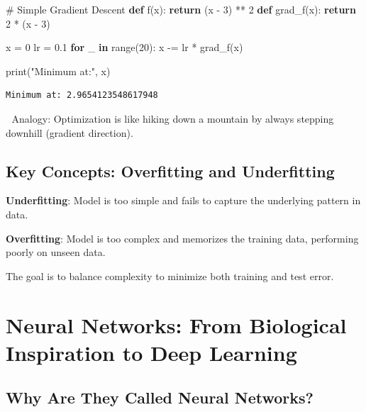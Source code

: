 \documentclass[
  letterpaper,
  DIV=11,
  numbers=noendperiod]{scrreprt}
\newenvironment{Shaded}{\begin{snugshade}}{\end{snugshade}}
\newcommand{\BuiltInTok}[1]{\textcolor[rgb]{0.00,0.23,0.31}{#1}}
\newcommand{\CommentTok}[1]{\textcolor[rgb]{0.37,0.37,0.37}{#1}}
\newcommand{\ControlFlowTok}[1]{\textcolor[rgb]{0.00,0.23,0.31}{\textbf{#1}}}
\newcommand{\DecValTok}[1]{\textcolor[rgb]{0.68,0.00,0.00}{#1}}
\newcommand{\FloatTok}[1]{\textcolor[rgb]{0.68,0.00,0.00}{#1}}
\newcommand{\KeywordTok}[1]{\textcolor[rgb]{0.00,0.23,0.31}{\textbf{#1}}}
\newcommand{\NormalTok}[1]{\textcolor[rgb]{0.00,0.23,0.31}{#1}}
\newcommand{\OperatorTok}[1]{\textcolor[rgb]{0.37,0.37,0.37}{#1}}
\newcommand{\StringTok}[1]{\textcolor[rgb]{0.13,0.47,0.30}{#1}}
\begin{document}
\begin{Shaded}
\begin{Highlighting}[]
\CommentTok{\# Simple Gradient Descent}
\KeywordTok{def}\NormalTok{ f(x): }\ControlFlowTok{return}\NormalTok{ (x }\OperatorTok{{-}} \DecValTok{3}\NormalTok{) }\OperatorTok{**} \DecValTok{2}
\KeywordTok{def}\NormalTok{ grad\_f(x): }\ControlFlowTok{return} \DecValTok{2} \OperatorTok{*}\NormalTok{ (x }\OperatorTok{{-}} \DecValTok{3}\NormalTok{)}

\NormalTok{x }\OperatorTok{=} \DecValTok{0}
\NormalTok{lr }\OperatorTok{=} \FloatTok{0.1}
\ControlFlowTok{for}\NormalTok{ \_ }\KeywordTok{in} \BuiltInTok{range}\NormalTok{(}\DecValTok{20}\NormalTok{):}
\NormalTok{    x }\OperatorTok{{-}=}\NormalTok{ lr }\OperatorTok{*}\NormalTok{ grad\_f(x)}

\BuiltInTok{print}\NormalTok{(}\StringTok{"Minimum at:"}\NormalTok{, x)}
\end{Highlighting}
\end{Shaded}

\begin{verbatim}
Minimum at: 2.9654123548617948
\end{verbatim}

📌 Analogy: Optimization is like hiking down a mountain by always
stepping downhill (gradient direction).

\subsection{Key Concepts: Overfitting and
Underfitting}\label{key-concepts-overfitting-and-underfitting}

\textbf{Underfitting}: Model is too simple and fails to capture the
underlying pattern in data.

\textbf{Overfitting}: Model is too complex and memorizes the training
data, performing poorly on unseen data.

The goal is to balance complexity to minimize both training and test
error.

\section{Neural Networks: From Biological Inspiration to Deep
Learning}\label{neural-networks-from-biological-inspiration-to-deep-learning}

\subsection{Why Are They Called Neural
Networks?}\label{why-are-they-called-neural-networks}
\end{document}
